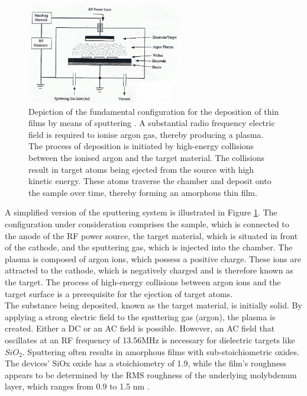 \begin{figure}[htbp!] 
    \centering    
    \includegraphics[width=0.6\textwidth]{Chapter3/Figs/b.png}
    \caption[Radio Frequency Magnetron Sputtering]{Depiction of the fundamental configuration for the deposition of thin films by means of sputtering \cite{jeong2008origin}. A substantial radio frequency electric field is required to ionise argon gas, thereby producing a plasma. The process of deposition is initiated by high-energy collisions between the ionised argon and the target material. The collisions result in target atoms being ejected from the source with high kinetic energy. These atoms traverse the chamber and deposit onto the sample over time, thereby forming an amorphous thin film.}
    \label{fig:3b}
\end{figure}

\noindent A simplified version of the sputtering system is illustrated in Figure \ref{fig:3b}. The configuration under consideration comprises the sample, which is connected to the anode of the RF power source, the target material, which is situated in front of the cathode, and the sputtering gas, which is injected into the chamber. The plasma is composed of argon ions, which possess a positive charge. These ions are attracted to the cathode, which is negatively charged and is therefore known as the target. The process of high-energy collisions between argon ions and the target surface is a prerequisite for the ejection of target atoms.\\

\noindent  The substance being deposited, known as the target material, is initially solid. By applying a strong electric field to the sputtering gas (argon), the plasma is created. Either a DC or an AC field is possible. However, an AC field that oscillates at an RF frequency of 13.56MHz is necessary for dielectric targets like $SiO_2$. Sputtering often results in amorphous films with sub-stoichiometric oxides. The devices' SiOx oxide has a stoichiometry of 1.9, while the film's roughness appears to be determined by the RMS roughness of the underlying molybdenum layer, which ranges from 0.9 to 1.5 nm \cite{kenyon2019interplay}. \\


